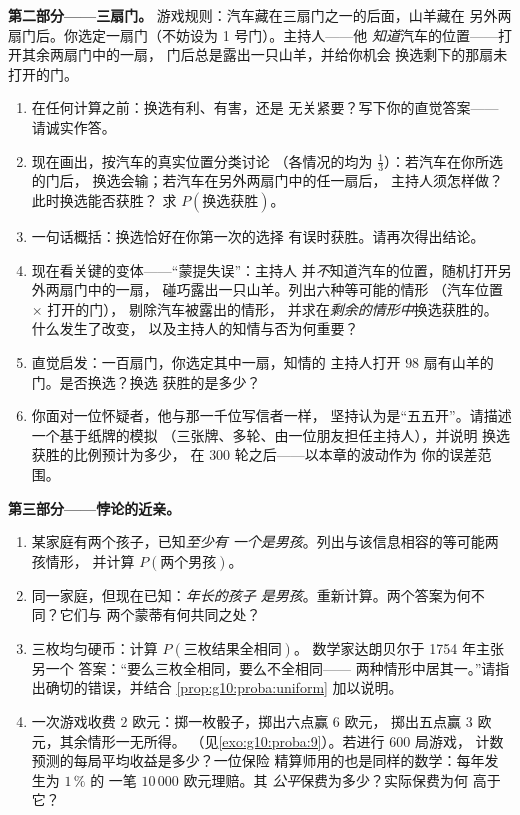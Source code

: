 \begin{problem}
\medskip
\noindent\textbf{第二部分——三扇门。}
游戏规则：汽车藏在三扇门之一的后面，山羊藏在
另外两扇门后。你选定一扇门（不妨设为 1 号门）。主持人——他
\emph{知道}汽车的位置——打开其余两扇门中的一扇，
门后总是露出一只山羊，并给你机会
换选剩下的那扇未打开的门。
\begin{enumerate}[resume]
  \item 在任何计算之前：换选有利、有害，还是
        无关紧要？写下你的直觉答案——请诚实作答。
  \item 现在画出，按汽车的真实位置分类讨论
        （各情况的均为 $\frac13$）：若汽车在你所选的门后，
        换选会输；若汽车在另外两扇门中的任一扇后，
        主持人须怎样做？此时换选能否获胜？
        求 $P(\text{换选获胜})$。
  \item 一句话概括：换选恰好在你第一次的选择
        有误时获胜。请再次得出结论。
  \item 现在看关键的变体——“蒙提失误”：主持人
        并\emph{不}知道汽车的位置，随机打开另外两扇门中的一扇，
        碰巧露出一只山羊。列出六种等可能的情形
        （汽车位置 $\times$ 打开的门），
        剔除汽车被露出的情形，
        并求在\emph{剩余的情形中}换选获胜的。
        什么发生了改变，
        以及主持人的知情与否为何重要？
  \item 直觉启发：一百扇门，你选定其中一扇，知情的
        主持人打开 $98$ 扇有山羊的门。是否换选？换选
        获胜的是多少？
  \item 你面对一位怀疑者，他与那一千位写信者一样，
        坚持认为是“五五开”。请描述一个基于纸牌的模拟
        （三张牌、多轮、由一位朋友担任主持人），并说明
        换选获胜的比例预计为多少，
        在 $300$ 轮之后——以本章的波动作为
        你的误差范围。
\end{enumerate}

\medskip
\noindent\textbf{第三部分——悖论的近亲。}
\begin{enumerate}[resume]
  \item 某家庭有两个孩子，已知\emph{至少有
        一个是男孩}。列出与该信息相容的等可能两孩情形，
        并计算
        $P(\text{两个男孩})$。
  \item 同一家庭，但现在已知：\emph{年长的孩子
        是男孩}。重新计算。两个答案为何不同？它们与
        两个蒙蒂有何共同之处？
  \item 三枚均匀硬币：计算 $P(\text{三枚结果全相同})$。
        数学家达朗贝尔于 1754 年主张另一个
        答案：“要么三枚全相同，要么不全相同——
        两种情形中居其一。”请指出确切的错误，并结合
        \cref{prop:g10:proba:uniform} 加以说明。
  \item 一次游戏收费 $2$ 欧元：掷一枚骰子，掷出六点赢 $6$ 欧元，
        掷出五点赢 $3$ 欧元，其余情形一无所得。
        （见\cref{exo:g10:proba:9}）。若进行 $600$ 局游戏，
        计数预测的每局平均收益是多少？一位保险
        精算师用的也是同样的数学：每年发生为 $1\,\%$ 的
        一笔 $10\,000$ 欧元理赔。其
        \emph{公平}保费为多少？实际保费为何
        高于它？
\end{enumerate}


\end{problem}
